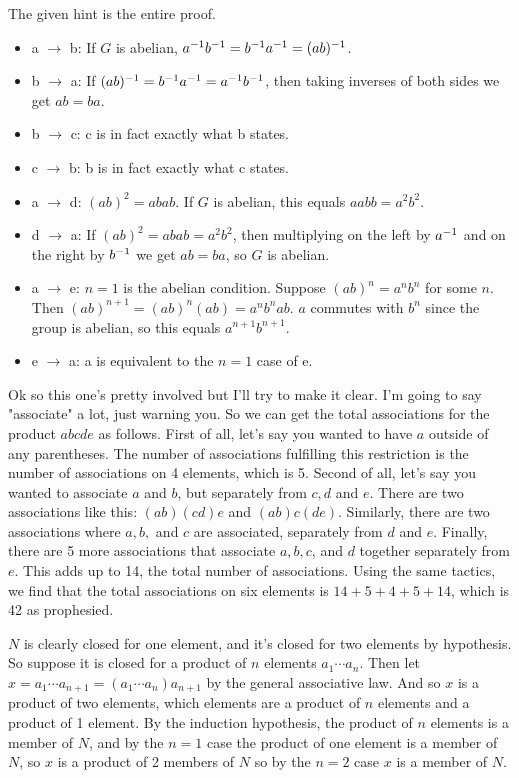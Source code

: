 \documentclass[11pt, oneside]{article}   	%
\begin{document}
\item The given hint is the entire proof.
\item \begin{itemize}
\item a $\rightarrow$ b: If $G$ is abelian, $a^{-1} b^{-1} = b^{-1} a^{-1} = (ab)^{-1}$.
\item b $\rightarrow$ a: If $(ab)^{-1} = b^{-1} a^{-1}  = a^{-1} b^{-1}$, then taking inverses of both sides we get $ab = ba$.
\item b $\rightarrow$ c: c is in fact exactly what b states.
\item c $\rightarrow$ b: b is in fact exactly what c states.
\item a $\rightarrow$ d: $(ab)^2 = abab$. If $G$ is abelian, this equals $aabb = a^2b^2$.
\item d $\rightarrow$ a: If $(ab)^2 = abab = a^2b^2$, then multiplying on the left by $a^{-1}$ and on the right by $b^{-1}$ we get $ab = ba$, so $G$ is abelian.
\item a $\rightarrow$ e: $n=1$ is the abelian condition. Suppose $(ab)^n = a^nb^n$ for some $n$. Then $(ab)^{n+1} = (ab)^n(ab) = a^nb^nab.$ $a$ commutes with $b^n$ since the group is abelian, so this equals $a^{n+1}b^{n+1}$.
\item e $\rightarrow$ a: a is equivalent to the $n=1$ case of e.
\end{itemize}
\item Ok so this one's pretty involved but I'll try to make it clear. I'm going to say "associate" a lot, just warning you. So we can get the total associations for the product $abcde$ as follows. First of all, let's say you wanted to have $a$ outside of any parentheses. The number of associations fulfilling this restriction is the number of associations on 4 elements, which is 5. Second of all, let's say you wanted to associate $a$ and $b$, but separately from $c, d$ and $e$. There are two associations like this: $(ab)(cd)e$ and $(ab)c(de)$. Similarly, there are two associations where $a, b, $ and $c$ are associated, separately from $d$ and $e$. Finally, there are 5 more associations that associate $a, b, c$, and $d$ together separately from $e$. This adds up to 14, the total number of associations. Using the same tactics, we find that the total associations on six elements is $14 + 5 + 4 + 5 + 14$, which is 42 as prophesied.
\item $N$ is clearly closed for one element, and it's closed for two elements by hypothesis. So suppose it is closed for a product of $n$ elements $a_1\cdots a_n$. Then let $x = a_1 \cdots a_{n+1} = (a_1 \cdots a_n)a_{n+1}$ by the general associative law. And so $x$ is a product of two elements, which elements are a product of $n$ elements and a product of 1 element. By the induction hypothesis, the product of $n$ elements is a member of $N$, and by the $n=1$ case the product of one element is a member of $N$, so $x$ is a product of 2 members of $N$ so by the $n=2$ case $x$ is a member of $N$. 
\ee
\end{document}
